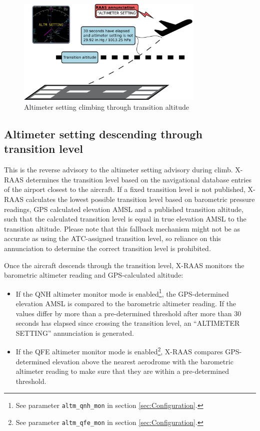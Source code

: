 \documentclass[a4paper,12pt]{article}
\newcommand{\confopt}[1]{\texttt{#1}}
\begin{document}
\begin{figure}[H]
\begin{center}
\includegraphics[width=0.8\textwidth]{../src/alt_setting_clb.pdf}
\end{center}
\caption{Altimeter setting climbing through transition altitude}
\end{figure}

\newpage
\subsection{Altimeter setting descending through transition level}
\label{subsec:AltmQNHQFEMon}

This is the reverse advisory to the altimeter setting advisory during
climb. X-RAAS determines the transition level based on the navigational
database entries of the airport closest to the aircraft. If a fixed
transition level is not published, X-RAAS calculates the lowest possible
transition level based on barometric pressure readings, GPS calculated
elevation AMSL and a published transition altitude, such that the
calculated transition level is equal in true elevation AMSL to the
transition altitude. Please note that this fallback mechanism might not
be as accurate as using the ATC-assigned transition level, so reliance on
this annunciation to determine the correct transition level is
prohibited.

Once the aircraft descends through the transition level, X-RAAS monitors
the barometric altimeter reading and GPS-calculated altitude:

\begin{itemize}

\item If the QNH altimeter monitor mode is enabled\footnote{See parameter
\confopt{altm\_qnh\_mon} in section \ref{sec:Configuration}.}, the
GPS-determined elevation AMSL is compared to the barometric altimeter
reading. If the values differ by more than a pre-determined threshold
after more than 30 seconds has elapsed since crossing the transition
level, an “ALTIMETER SETTING” annunciation is generated.

\item If the QFE altimeter monitor mode is enabled\footnote{See parameter
\confopt{altm\_qfe\_mon} in section \ref{sec:Configuration}.}, X-RAAS compares
GPS-determined elevation above the nearest aerodrome with the barometric
altimeter reading to make sure that they are within a pre-determined
threshold.

\end{itemize}
\end{document}
